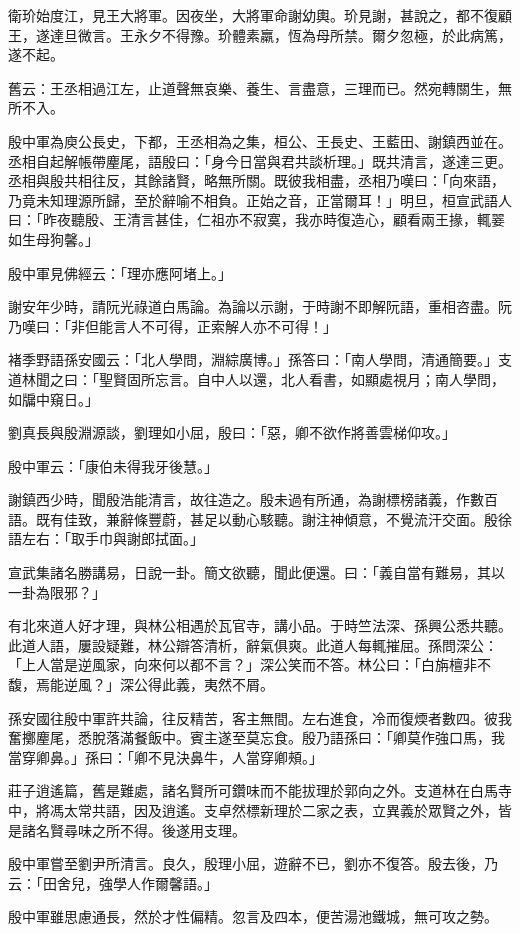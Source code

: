 衛玠始度江，見王大將軍。因夜坐，大將軍命謝幼輿。玠見謝，甚說之，都不復顧王，遂達旦微言。王永夕不得豫。玠體素羸，恆為母所禁。爾夕忽極，於此病篤，遂不起。

舊云：王丞相過江左，止道聲無哀樂、養生、言盡意，三理而已。然宛轉關生，無所不入。

殷中軍為庾公長史，下都，王丞相為之集，桓公、王長史、王藍田、謝鎮西並在。丞相自起解帳帶麈尾，語殷曰：「身今日當與君共談析理。」既共清言，遂達三更。丞相與殷共相往反，其餘諸賢，略無所關。既彼我相盡，丞相乃嘆曰：「向來語，乃竟未知理源所歸，至於辭喻不相負。正始之音，正當爾耳！」明旦，桓宣武語人曰：「昨夜聽殷、王清言甚佳，仁祖亦不寂寞，我亦時復造心，顧看兩王掾，輒翣如生母狗馨。」

殷中軍見佛經云：「理亦應阿堵上。」

謝安年少時，請阮光祿道白馬論。為論以示謝，于時謝不即解阮語，重相咨盡。阮乃嘆曰：「非但能言人不可得，正索解人亦不可得！」

褚季野語孫安國云：「北人學問，淵綜廣博。」孫答曰：「南人學問，清通簡要。」支道林聞之曰：「聖賢固所忘言。自中人以還，北人看書，如顯處視月；南人學問，如牖中窺日。」

劉真長與殷淵源談，劉理如小屈，殷曰：「惡，卿不欲作將善雲梯仰攻。」

殷中軍云：「康伯未得我牙後慧。」

謝鎮西少時，聞殷浩能清言，故往造之。殷未過有所通，為謝標榜諸義，作數百語。既有佳致，兼辭條豐蔚，甚足以動心駭聽。謝注神傾意，不覺流汗交面。殷徐語左右：「取手巾與謝郎拭面。」

宣武集諸名勝講易，日說一卦。簡文欲聽，聞此便還。曰：「義自當有難易，其以一卦為限邪？」

有北來道人好才理，與林公相遇於瓦官寺，講小品。于時竺法深、孫興公悉共聽。此道人語，屢設疑難，林公辯答清析，辭氣俱爽。此道人每輒摧屈。孫問深公：「上人當是逆風家，向來何以都不言？」深公笑而不答。林公曰：「白旃檀非不馥，焉能逆風？」深公得此義，夷然不屑。

孫安國往殷中軍許共論，往反精苦，客主無間。左右進食，冷而復煗者數四。彼我奮擲麈尾，悉脫落滿餐飯中。賓主遂至莫忘食。殷乃語孫曰：「卿莫作強口馬，我當穿卿鼻。」孫曰：「卿不見決鼻牛，人當穿卿頰。」

莊子逍遙篇，舊是難處，諸名賢所可鑽味而不能拔理於郭向之外。支道林在白馬寺中，將馮太常共語，因及逍遙。支卓然標新理於二家之表，立異義於眾賢之外，皆是諸名賢尋味之所不得。後遂用支理。

殷中軍嘗至劉尹所清言。良久，殷理小屈，遊辭不已，劉亦不復答。殷去後，乃云：「田舍兒，強學人作爾馨語。」

殷中軍雖思慮通長，然於才性偏精。忽言及四本，便苦湯池鐵城，無可攻之勢。

